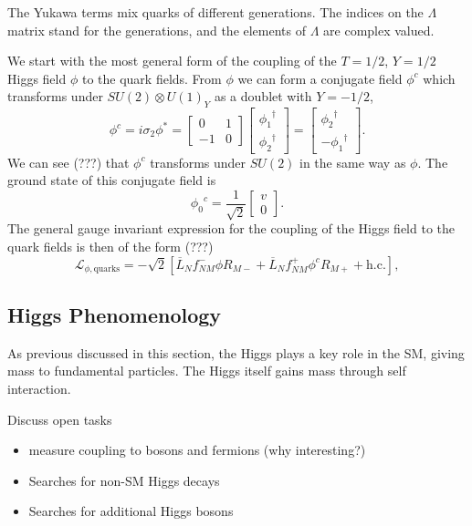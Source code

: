The Yukawa terms mix quarks of different generations. The indices on the $\Lambda$ matrix stand for the generations, and the elements of $\Lambda$ are complex valued.


We start with the most general form of the coupling of the $T = 1/2$, $Y=1/2$ Higgs field $\phi$ to the quark fields. From $\phi$ we can form a conjugate field $\phi^c$ which transforms under $SU(2) \otimes U(1)_Y$ as a doublet with $Y = -1/2$,
%
\begin{equation}\label{phi c field definition}
    \phi^c = i \sigma_2 \phi^* = 
    \begin{bmatrix}
    0 & 1 \\ -1 & 0
    \end{bmatrix} 
    \begin{bmatrix}
    {\phi_1}^\dagger \\ {\phi_2}^\dagger
    \end{bmatrix} = \begin{bmatrix}
    {\phi_2}^\dagger \\ -{\phi_1}^\dagger
    \end{bmatrix} .
\end{equation}
%
We can see (???) that $\phi^c$ transforms under $SU(2)$ in the same way as $\phi$. The ground state of this conjugate field is 
%
\begin{equation}
    {\phi_0}^c = \frac{1}{\sqrt{2}} \begin{bmatrix} v \\ 0 \end{bmatrix} .
\end{equation}
%
The general gauge invariant expression for the coupling of the Higgs field to the quark fields is then of the form (???)
%
\begin{equation}\label{quark mass term}
    \mathcal{L}_{\phi, \text{quarks}} = - \sqrt{2} \left[ \overline{L}_N f^-_{NM} \phi R_{M-} +
    \overline{L}_N f^+_{NM} \phi^c R_{M+} + \text{h.c.}
    \right] ,
\end{equation}
%


\subsection{Higgs Phenomenology}


As previous discussed in this section, the Higgs plays a key role in the SM, giving mass to fundamental particles. 
The Higgs itself gains mass through self interaction.

Discuss open tasks
\begin{itemize}
  \item measure coupling to bosons and fermions (why interesting?)
  \item Searches for non-SM Higgs decays
  \item Searches for additional Higgs bosons
\end{itemize}

